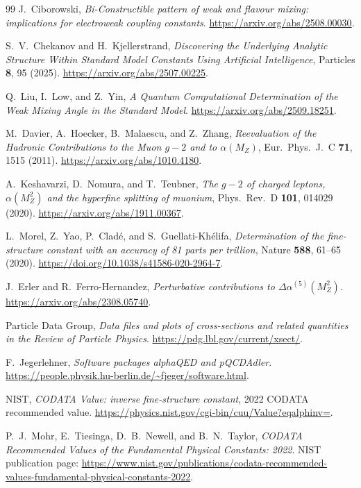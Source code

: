 \documentclass[11pt]{article}
\theoremstyle{remark}
\begin{document}
\begin{thebibliography}{99}
J.\ Ciborowski,
\emph{Bi-Constructible pattern of weak and flavour mixing: implications for electroweak coupling constants}.
\url{https://arxiv.org/abs/2508.00030}.

S.\ V.\ Chekanov and H.\ Kjellerstrand,
\emph{Discovering the Underlying Analytic Structure Within Standard Model Constants Using Artificial Intelligence},
Particles \textbf{8}, 95 (2025).
\url{https://arxiv.org/abs/2507.00225}.

Q.\ Liu, I.\ Low, and Z.\ Yin,
\emph{A Quantum Computational Determination of the Weak Mixing Angle in the Standard Model}.
\url{https://arxiv.org/abs/2509.18251}.

M.\ Davier, A.\ Hoecker, B.\ Malaescu, and Z.\ Zhang,
\emph{Reevaluation of the Hadronic Contributions to the Muon \(g-2\) and to \(\alpha(M_Z)\)},
Eur.\ Phys.\ J.\ C \textbf{71}, 1515 (2011).
\url{https://arxiv.org/abs/1010.4180}.

A.\ Keshavarzi, D.\ Nomura, and T.\ Teubner,
\emph{The \(g-2\) of charged leptons, \(\alpha(M_Z^2)\) and the hyperfine splitting of muonium},
Phys.\ Rev.\ D \textbf{101}, 014029 (2020).
\url{https://arxiv.org/abs/1911.00367}.

L.\ Morel, Z.\ Yao, P.\ Cladé, and S.\ Guellati-Khélifa,
\emph{Determination of the fine-structure constant with an accuracy of 81 parts per trillion},
Nature \textbf{588}, 61--65 (2020).
\url{https://doi.org/10.1038/s41586-020-2964-7}.

J.\ Erler and R.\ Ferro-Hernandez,
\emph{Perturbative contributions to \(\Delta\alpha^{(5)}(M_Z^2)\)}.
\url{https://arxiv.org/abs/2308.05740}.

Particle Data Group,
\emph{Data files and plots of cross-sections and related quantities in the Review of Particle Physics}.
\url{https://pdg.lbl.gov/current/xsect/}.

F.\ Jegerlehner,
\emph{Software packages alphaQED and pQCDAdler}.
\url{https://people.physik.hu-berlin.de/~fjeger/software.html}.

NIST,
\emph{CODATA Value: inverse fine-structure constant},
2022 CODATA recommended value.
\url{https://physics.nist.gov/cgi-bin/cuu/Value?eqalphinv=}.

P.\ J.\ Mohr, E.\ Tiesinga, D.\ B.\ Newell, and B.\ N.\ Taylor,
\emph{CODATA Recommended Values of the Fundamental Physical Constants: 2022}.
NIST publication page:
\url{https://www.nist.gov/publications/codata-recommended-values-fundamental-physical-constants-2022}.


\end{thebibliography}
\end{document}
